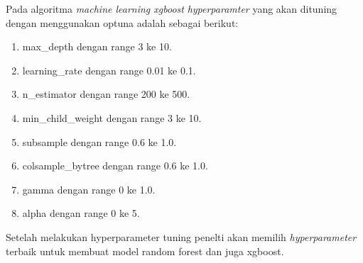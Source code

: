 Pada algoritma \textit{machine learning xgboost} \textit{hyperparamter} yang akan dituning dengan menggunakan optuna adalah sebagai berikut\cite{Verma2024ExploringKX}:
\begin{enumerate}[noitemsep]
    \item max\_depth dengan range 3 ke 10.
    \item learning\_rate dengan range 0.01 ke 0.1.
    \item n\_estimator dengan range 200 ke 500.
    \item min\_child\_weight dengan range 3 ke 10.
    \item subsample dengan range 0.6 ke 1.0.
    \item colsample\_bytree dengan range 0.6 ke 1.0.
    \item gamma dengan range 0 ke 1.0.
    \item alpha dengan range 0 ke 5.
\end{enumerate}
Setelah melakukan hyperparameter tuning penelti akan memilih \textit{hyperparameter} terbaik untuk membuat model random forest dan juga xgboost.

